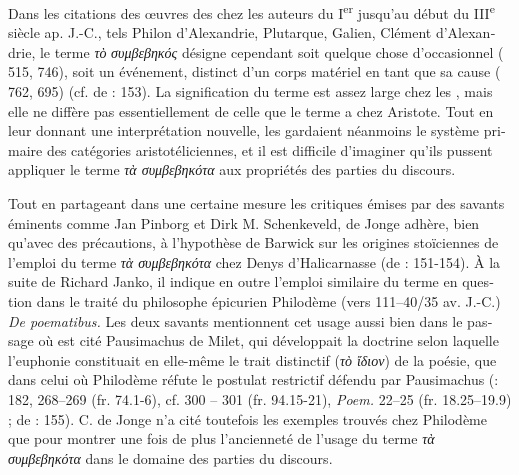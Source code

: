 \documentclass[output=paper]{langsci/langscibook}
\begin{document}
\begin{otherlanguage}{french}
Dans les citations des œuvres des  chez les auteurs du I\textsuperscript{e}\textsuperscript{r} jusqu’au début du III\textsuperscript{e} siècle ap. J.-C., tels Philon d’Alexandrie, Plutarque, Galien, Clément d’Alexandrie, le terme \textit{τὸ} \textit{συμβεβηκός} désigne cependant soit quelque chose d’occasionnel ( 515, 746), soit un événement, distinct d’un corps matériel en tant que sa cause ( 762, 695) (cf. de \citealt{jonge_between_2008}: 153). La signification du terme est assez large chez les , mais elle ne diffère pas essentiellement de celle que le terme a chez Aristote. Tout en leur donnant une interprétation nouvelle, les  gardaient néanmoins le système primaire des catégories aristotéliciennes, et il est difficile d’imaginer qu’ils pussent appliquer le terme \textit{τὰ συμβεβηκότα} aux propriétés des parties du discours. 

Tout en partageant dans une certaine mesure les critiques émises par des savants éminents comme Jan Pinborg et Dirk M. Schenkeveld, de Jonge adhère, bien qu’avec des précautions, à l’hypothèse de Barwick sur les origines stoïciennes de l’emploi du terme \textit{τὰ συμβεβηκότα} chez Denys d’Halicarnasse (de \citealt{jonge_between_2008} : 151-154). À la suite de Richard Janko, il indique en outre l’emploi similaire du terme en question dans le traité du philosophe épicurien Philodème (vers 111–40/35 av. J.-C.) \textit{De poematibus.} Les deux savants mentionnent cet usage aussi bien dans le passage où est cité Pausimachus de Milet, qui développait la doctrine selon laquelle l’euphonie constituait en elle-même le trait distinctif (\textit{τὸ ἴδιον}) de la poésie, que dans celui où Philodème réfute le postulat restrictif défendu par Pausimachus (\citealt{janko_philodemus._2000}: 182, 268–269 (fr. 74.1-6), cf. 300 – 301 (fr. 94.15-21),  \textit{Poem.} 22–25 (fr. 18.25–19.9) ; de \citealt{jonge_between_2008}: 155). C. de Jonge n’a cité toutefois les exemples trouvés chez Philodème que pour montrer une fois de plus l’ancienneté de l’usage du terme \textit{τὰ συμβεβηκότα} dans le domaine des parties du discours.


\end{otherlanguage}
\end{document}
